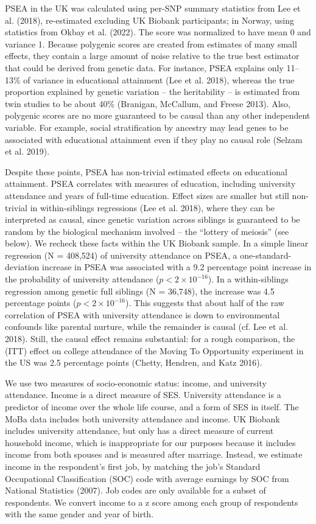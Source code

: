 \documentclass[
  12pt,
]{article}
\theoremstyle{definition}
\theoremstyle{definition}
\theoremstyle{definition}
\theoremstyle{definition}
\theoremstyle{remark}
\begin{document}
PSEA in the UK was calculated using per-SNP summary statistics from Lee et al. (2018),
re-estimated excluding UK Biobank participants; in Norway, using statistics
from Okbay et al. (2022). The score was normalized to
have mean 0 and variance 1. Because polygenic scores are created from estimates
of many small effects, they contain a large amount of noise relative
to the true best estimator that could be derived from genetic data. For
instance, PSEA explains only 11--13\% of variance in educational attainment
(Lee et al. 2018), whereas the true proportion explained by genetic
variation -- the heritability -- is estimated from twin studies to be about 40\%
(Branigan, McCallum, and Freese 2013). Also, polygenic scores are no more guaranteed
to be causal than any other independent variable. For example, social
stratification by ancestry may lead genes to be associated with educational
attainment even if they play no causal role (Selzam et al. 2019).

Despite these points, PSEA has non-trivial estimated effects on educational
attainment. PSEA correlates with measures of education, including university
attendance and years of full-time education. Effect sizes are smaller but still
non-trivial in within-siblings regressions (Lee et al. 2018), where they can be
interpreted as causal, since genetic variation across siblings is guaranteed to
be random by the biological mechanism involved -- the ``lottery of meiosis'' (see
below). We recheck these facts within the UK Biobank sample. In a simple linear
regression (N = 408,524) of university attendance on PSEA, a
one-standard-deviation increase in PSEA was associated with a
9.2 percentage point increase in the probability of
university attendance (\(p < 2 \times 10^{-16}\)). In a within-siblings regression
among genetic full siblings (N = 36,748), the increase
was 4.5 percentage points (\(p < 2 \times 10^{-16}\)). This suggests that about half of the raw
correlation of PSEA with university attendance is down to environmental
confounds like parental nurture, while the remainder is causal (cf. Lee et al. 2018). Still, the
causal effect remains substantial: for a rough comparison, the (ITT) effect on
college attendance of the Moving To Opportunity experiment in the US was 2.5
percentage points (Chetty, Hendren, and Katz 2016).

We use two measures of socio-economic status: income, and university attendance.
Income is a direct measure of SES. University attendance is a predictor of
income over the whole life course, and a form of SES in itself. The MoBa data
includes both university attendance and income. UK Biobank includes university
attendance, but only has a direct measure of current household income, which is
inappropriate for our purposes because it includes income from both spouses and
is measured after marriage. Instead, we estimate income in the
respondent's first job, by matching the job's Standard Occupational
Classification (SOC) code with average earnings by SOC from National Statistics (2007). Job
codes are only available for a subset of respondents. We convert income to a z
score among each group of respondents with the same gender and year of birth.
\end{document}
